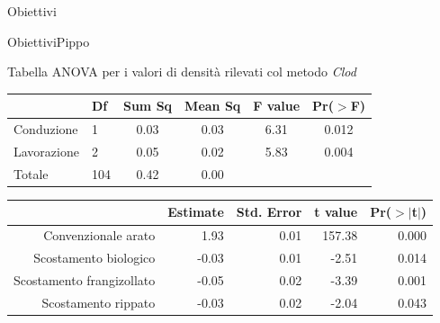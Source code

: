 \documentclass[10pt]{beamer}
\begin{document}
\begin{frame}{Obiettivi}
\begin{frame}{Obiettivi}{Pippo}
\begin{frame}{Tabella ANOVA per i valori di densità rilevati col metodo \emph{Clod}}
  \begin{table}
    \centering
    \begin{tabular}{llcccc}
      \hline
      & Df & Sum Sq & Mean Sq & F value & Pr($>$F) \\ 
      \hline
      Conduzione & 1 & 0.03 & 0.03 & 6.31 & 0.012 \\ 
      Lavorazione & 2 & 0.05 & 0.02 & 5.83 & 0.004 \\ 
      Totale & 104 & 0.42 & 0.00 &  &  \\ 
      \hline
    \end{tabular}
    \label{tab:Anova densita per spinta}
  \end{table}
\end{frame}

\begin{frame}[label=summary]
  \footnotesize
  \begin{table}[ht]
    \centering
    \begin{tabular}{rrrrr}
      \hline
      & Estimate & Std. Error & t value & Pr($>$$|$t$|$) \\ 
      \hline
      Convenzionale arato & 1.93 & 0.01 & 157.38 & 0.000 \\ 
      Scostamento biologico & -0.03 & 0.01 & -2.51 & 0.014 \\ 
      Scostamento frangizollato & -0.05 & 0.02 & -3.39 & 0.001 \\ 
      Scostamento rippato & -0.03 & 0.02 & -2.04 & 0.043 \\ 
      \hline
    \end{tabular}
    \label{tab:Riassunto densita spinta}
  \end{table}
\end{frame}


\end{frame}
\end{frame}
\end{document}
